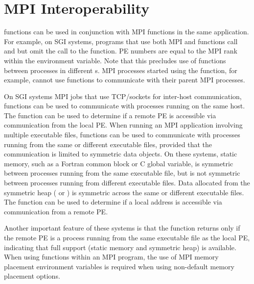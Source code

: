 \section{\ac{MPI} Interoperability}
\begin{sloppypar} %
\openshmem functions can be used in conjunction  with  \ac{MPI}
functions  in  the  same  application.   For example, on SGI systems, programs that use both \ac{MPI} and
\openshmem functions call  and  but omit the call
to  the  function.  \openshmem \ac{PE} numbers are equal to the \ac{MPI} rank
within the  environment variable.  Note  that  this  precludes 
use of \openshmem functions between processes in different s. 
\ac{MPI} processes started using the   function,  for
example,  cannot  use  \openshmem functions to communicate with their parent
\ac{MPI} processes.
\end{sloppypar}
On SGI systems \ac{MPI} jobs that use TCP/sockets for inter-host communication, \openshmem functions can be used to communicate with processes running on the same
 host.  The  function can be used to determine if a remote \ac{PE}
 is accessible via \openshmem communication from the local \ac{PE}. When  running  an  \ac{MPI} application involving multiple executable files, \openshmem functions can be used to communicate with processes running  from the same or different executable files, provided that the communication is limited to symmetric data objects.  On these systems, static  memory, such as a Fortran common block or C global variable, is symmetric between processes running from the same executable file,  but
 is  not  symmetric  between processes running from different executable
 files.  Data allocated from the symmetric heap (  or  )
 is  symmetric  across  the same or different executable files. The function 
  can be used to determine  if  a  local  address  is
 accessible via \openshmem communication from a remote \ac{PE}.

 Another important feature of these systems is that the   function returns  only if the remote \ac{PE} is a process running from the same  executable  file  as  the
 local PE, indicating that full \openshmem support (static memory and symmetric heap) is available. When using \openshmem functions within an \ac{MPI} program, the use of 
 \ac{MPI}  memory placement environment variables is required when using non-default memory 
 placement options.
